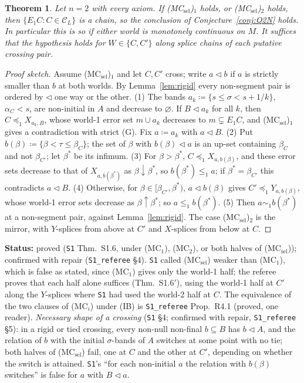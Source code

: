 \documentclass[11pt]{article}
\newtheorem{theorem}{Theorem}[section]
\theoremstyle{definition}
\theoremstyle{remark}
\newcommand{\C}{\mathcal C}
\newcommand{\src}[1]{\texttt{#1}}
\newcommand{\status}[1]{\par\smallskip\noindent\textbf{Status:} #1\par\smallskip}
\begin{document}
\begin{theorem}\label{thm:MC}
Let $n=2$ with every axiom. If (MC$_{\mathrm{sel}}$)$_1$ holds, or (MC$_{\mathrm{sel}}$)$_2$ holds, then $\{E_1C:C\in\C_L\}$ is a chain, so the conclusion of Conjecture~\ref{conj:Q2N} holds. In particular this is so if either world is monotonely continuous on $M$. It suffices that the hypothesis holds for $W\in\{C,C'\}$ along splice chains of each putative crossing pair.
\end{theorem}
\begin{proof}[Proof sketch]
Assume (MC$_{\mathrm{sel}}$)$_1$ and let $C,C'$ cross; write $a\lhd b$ if $a$ is strictly smaller than $b$ at both worlds. By Lemma~\ref{lem:rigid} every non-segment pair is ordered by $\lhd$ one way or the other. (1) The bands $a_k\coloneqq\{s\le\sigma<s+1/k\}$, $\alpha_C<s$, are non-initial in $A$ and decrease to $\varnothing$. If $B\lhd a_k$ for all $k$, then $C\preceq_1X_{a_k,B}$, whose world-1 error set $m\cup a_k$ decreases to $m\subsetneq E_1C$, and (MC$_{\mathrm{sel}}$)$_1$ gives a contradiction with strict (G). Fix $a\coloneqq a_k$ with $a\lhd B$. (2) Put $b(\beta)\coloneqq\{\beta<\tau\le\beta_C\}$; the set of $\beta$ with $b(\beta)\lhd a$ is an up-set containing $\beta_C$ and not $\beta_{C'}$; let $\beta^*$ be its infimum. (3) For $\beta>\beta^*$, $C\preceq_1X_{a,b(\beta)}$, and these error sets decrease to that of $X_{a,b(\beta^*)}$ as $\beta\downarrow\beta^*$, so $b(\beta^*)\le_1a$; if $\beta^*=\beta_{C'}$ this contradicts $a\lhd B$. (4) Otherwise, for $\beta\in[\beta_{C'},\beta^*)$, $a\lhd b(\beta)$ gives $C'\preceq_1Y_{a,b(\beta)}$, whose world-1 error sets decrease as $\beta\uparrow\beta^*$; so $a\le_1b(\beta^*)$. (5) Then $a\sim_1b(\beta^*)$ at a non-segment pair, against Lemma~\ref{lem:rigid}. The case (MC$_{\mathrm{sel}}$)$_2$ is the mirror, with $Y$-splices from above at $C'$ and $X$-splices from below at $C$.
\end{proof}
\status{proved (\src{S1} Thm.~S1.6, under (MC$_1$), (MC$_2$), or both halves of (MC$_{\mathrm{sel}}$)); confirmed with repair (\src{S1\_referee} \S4). \src{S1} called (MC$_{\mathrm{sel}}$) weaker than (MC$_1$), which is false as stated, since (MC$_1$) gives only the world-1 half; the referee proves that each half alone suffices (Thm.~S1.6$'$), using the world-1 half at $C'$ along the $Y$-splices where \src{S1} had used the world-2 half at $C$. The equivalence of the two clauses of (MC$_i$) under (IB) is \src{S1\_referee} Prop.~R4.1 (proved, one reader). \emph{Necessary shape of a crossing} (\src{S1} \S4; confirmed with repair, \src{S1\_referee} \S5): in a rigid or tied crossing, every non-null non-final $b\subseteq B$ has $b\lhd A$, and the relation of $b$ with the initial $\sigma$-bands of $A$ switches at some point with no tie; both halves of (MC$_{\mathrm{sel}}$) fail, one at $C$ and the other at $C'$, depending on whether the switch is attained. \src{S1}'s ``for each non-initial $a$ the relation with $b(\beta)$ switches'' is false for $a$ with $B\lhd a$.}
\end{document}
